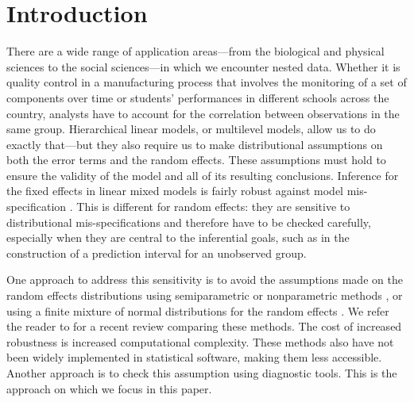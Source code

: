 \documentclass[12pt]{article} %
\newcommand{\hh}[1]{{\color{orange} #1}}
\begin{document}
\section{Introduction}\label{sec:intro}
There are a wide range of application areas---from the biological and physical sciences to the social sciences---in which we encounter nested  data.
Whether it is quality control in a manufacturing process that involves the monitoring of a set of components over  time  or students' performances in different schools across the country, analysts have to account for  the correlation between observations in the same group.  Hierarchical linear models, or multilevel models, allow us to do exactly that---but they also require us to make distributional assumptions on both the error terms and the random effects. These assumptions must hold to ensure the validity of the model and all of its resulting conclusions. 
Inference for the fixed effects in linear mixed models is fairly robust against model mis-specification \citep{Butler:1992tx, Verbeke:1997tf}. This is different for random effects: they are sensitive to  distributional mis-specifications and  therefore have to be checked carefully, especially when they are central to the inferential goals, such as in the construction of a prediction interval for an unobserved group.

One approach to address this sensitivity is to avoid the assumptions made on the random effects distributions using semiparametric or nonparametric methods \citep{Shen:1999gd, Zhang:2001wo, Ghidey:2004id}, or using a finite mixture of normal distributions for the random effects \citep{Verbeke:1996va}. We refer the reader to \cite{Ghidey:2010de} for a recent review comparing these methods. The cost of increased robustness is increased computational complexity. These methods also have not been widely implemented in statistical software, making them less accessible. Another approach is to check this assumption using diagnostic tools. This is the approach on which we focus in this paper.

\end{document}
